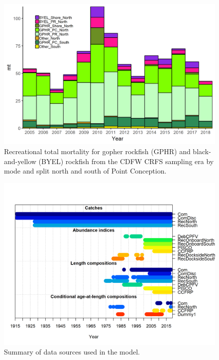 \documentclass[12pt,]{article}
\begin{document}
\begin{figure}
\centering
\includegraphics{Figures/CRFS_totalmort_gby.png}
\caption{Recreational total mortality for gopher rockfish (GPHR) and
black-and-yellow (BYEL) rockfish from the CDFW CRFS sampling era by mode
and split north and south of Point Conception. \label{fig:CFRS_catches}}
\end{figure}

\begin{figure}
\centering
\includegraphics{r4ss/plots_mod1/data_plot.png}
\caption{Summary of data sources used in the model.
\label{fig:data_plot}}
\end{figure}
\end{document}
